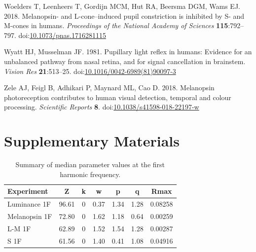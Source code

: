 \documentclass[
]{article}
\newlength{\cslhangindent}
\newlength{\cslentryspacingunit} %
\newenvironment{CSLReferences}[2] %
 {%
  \setlength{\parindent}{0pt}
  \ifodd #1
  \let\oldpar\par
  \def\par{\hangindent=\cslhangindent\oldpar}
  \fi
  \setlength{\parskip}{#2\cslentryspacingunit}
 }%
 {}
\begin{document}
\begin{CSLReferences}{1}{0}
\leavevmode{}%
Woelders T, Leenheers T, Gordijn MCM, Hut RA, Beersma DGM, Wams EJ. 2018. Melanopsin- and {L}-cone--induced pupil constriction is inhibited by {S}- and {M}-cones in humans. \emph{Proceedings of the National Academy of Sciences} \textbf{115}:792--797. doi:\href{https://doi.org/10.1073/pnas.1716281115}{10.1073/pnas.1716281115}

\leavevmode{}%
Wyatt HJ, Musselman JF. 1981. Pupillary light reflex in humans: Evidence for an unbalanced pathway from nasal retina, and for signal cancellation in brainstem. \emph{Vision Res} \textbf{21}:513--25. doi:\href{https://doi.org/10.1016/0042-6989(81)90097-3}{10.1016/0042-6989(81)90097-3}

\leavevmode{}%
Zele AJ, Feigl B, Adhikari P, Maynard ML, Cao D. 2018. Melanopsin photoreception contributes to human visual detection, temporal and colour processing. \emph{Scientific Reports} \textbf{8}. doi:\href{https://doi.org/10.1038/s41598-018-22197-w}{10.1038/s41598-018-22197-w}

\end{CSLReferences}

\hypertarget{supplementary-materials}{%
\section{Supplementary Materials}\label{supplementary-materials}}

\begin{table}

\caption{\label{tab:paramtable1F}Summary of median parameter values at the first harmonic frequency.}
\centering
\begin{tabular}[t]{l|c|c|c|c|c|c}
\hline
Experiment & Z & k & w & p & q & Rmax\\
\hline
Luminance 1F & 96.61 & 0 & 0.37 & 1.34 & 1.28 & 0.08258\\
\hline
Melanopsin 1F & 72.80 & 0 & 1.62 & 1.18 & 0.64 & 0.00259\\
\hline
L-M 1F & 62.89 & 0 & 1.52 & 1.54 & 1.28 & 0.00287\\
\hline
S 1F & 61.56 & 0 & 1.40 & 0.41 & 1.08 & 0.04916\\
\hline
\end{tabular}
\end{table}
\end{document}
